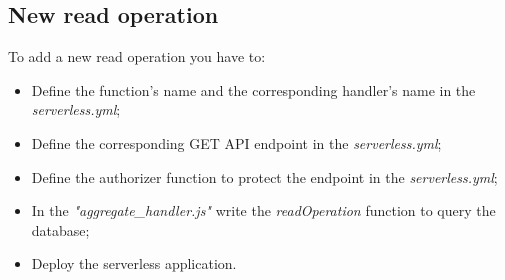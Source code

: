 \subsection{New read operation}
To add a new read operation you have to:
\begin{itemize}
	\item Define the function's name and the corresponding handler's name in the \emph{serverless.yml};
	\item Define the corresponding GET API endpoint in the \emph{serverless.yml};
	\item Define the authorizer function to protect the endpoint in the \emph{serverless.yml};
	\item In the \emph{"aggregate\_handler.js"} write the \emph{readOperation} function to query the database;
	\item Deploy the serverless application.
\end{itemize}